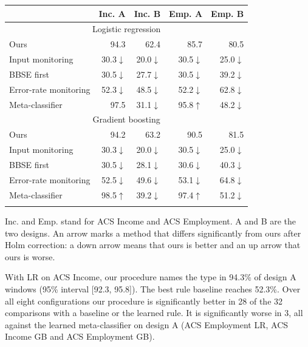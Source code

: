 \documentclass[pdflatex,sn-mathphys-num]{sn-jnl}
\begin{document}
\par\vspace{0.7\intextsep}\noindent\begin{minipage}{\textwidth}\centering\tablebodyfont
{}\label{tab:methods}%
\begin{tabular}{@{}lrrrr@{}}
\toprule
 & \multicolumn{1}{c}{Inc. A} & \multicolumn{1}{c}{Inc. B} & \multicolumn{1}{c}{Emp. A} & \multicolumn{1}{c}{Emp. B} \\
\midrule
\multicolumn{5}{c}{Logistic regression} \\
\midrule
Ours & 94.3 & 62.4 & 85.7 & 80.5 \\
Input monitoring & 30.3$\downarrow$ & 20.0$\downarrow$ & 30.5$\downarrow$ & 25.0$\downarrow$ \\
BBSE first & 30.5$\downarrow$ & 27.7$\downarrow$ & 30.5$\downarrow$ & 39.2$\downarrow$ \\
Error-rate monitoring & 52.3$\downarrow$ & 48.5$\downarrow$ & 52.2$\downarrow$ & 62.8$\downarrow$ \\
Meta-classifier & 97.5 & 31.1$\downarrow$ & 95.8$\uparrow$ & 48.2$\downarrow$ \\
\midrule
\multicolumn{5}{c}{Gradient boosting} \\
\midrule
Ours & 94.2 & 63.2 & 90.5 & 81.5 \\
Input monitoring & 30.3$\downarrow$ & 20.0$\downarrow$ & 30.5$\downarrow$ & 25.0$\downarrow$ \\
BBSE first & 30.5$\downarrow$ & 28.1$\downarrow$ & 30.6$\downarrow$ & 40.3$\downarrow$ \\
Error-rate monitoring & 52.5$\downarrow$ & 49.6$\downarrow$ & 53.1$\downarrow$ & 64.8$\downarrow$ \\
Meta-classifier & 98.5$\uparrow$ & 39.2$\downarrow$ & 97.4$\uparrow$ & 51.2$\downarrow$ \\
\botrule
\end{tabular}
\end{minipage}\par\vspace{0.7\intextsep}

Inc. and Emp. stand for ACS Income and ACS Employment. A and B are the two designs. An arrow marks a method that differs significantly from ours after Holm correction: a down arrow means that ours is better and an up arrow that ours is worse.

With LR on ACS Income, our procedure names the type in 94.3\% of design A windows (95\% interval [92.3, 95.8]). The best rule baseline reaches 52.3\%. Over all eight configurations our procedure is significantly better in 28 of the 32 comparisons with a baseline or the learned rule. It is significantly worse in 3, all against the learned meta-classifier on design A (ACS Employment LR, ACS Income GB and ACS Employment GB).
\end{document}

